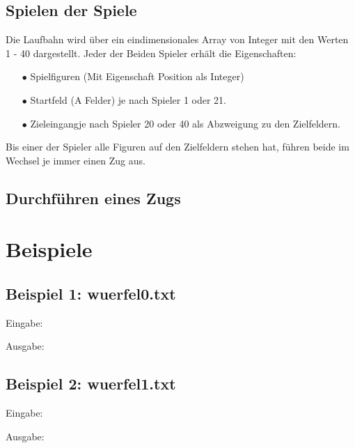 \documentclass[a4paper,11pt,ngerman]{scrartcl}
\begin{document}
\subsection{Spielen der \glqq Spiele\grqq}
Die Laufbahn wird über ein eindimensionales Array von Integer mit den Werten 1 - 40 dargestellt. Jeder der Beiden Spieler erhält die Eigenschaften:
\begin{enumerate}
	\item[$\bullet$] Spielfiguren (Mit Eigenschaft Position als Integer)
	\item[$\bullet$] Startfeld (\glqq A Felder\grqq) je nach Spieler 1 oder 21.
	\item[$\bullet$] \glqq Zieleingang\grqq \space je nach Spieler 20 oder 40 als Abzweigung zu den Zielfeldern.	
\end{enumerate} 
Bis einer der Spieler alle Figuren auf den Zielfeldern stehen hat, führen beide im Wechsel je immer einen Zug aus.
\subsection{Durchführen eines Zugs}


 

\section{Beispiele}
\subsection{Beispiel 1: wuerfel0.txt}
Eingabe:
\begin{tcolorbox}[center,width=12cm,title=Textfiles/wuerfel0.txt]
	\centering
	
\end{tcolorbox}
Ausgabe:
\centering
\begin{tcolorbox}[center,width=12cm,title=Textfiles/wuerfel0\_result.txt]
	
	
\end{tcolorbox}
\subsection{Beispiel 2: wuerfel1.txt}
Eingabe:
\begin{tcolorbox}[center,width=12cm,title=Textfiles/wuerfel1.txt]
	\centering
	
\end{tcolorbox}
Ausgabe:
\centering
\begin{tcolorbox}[center,width=12cm,title=Textfiles/wuerfel1\_result.txt]
	
	
\end{tcolorbox}
\end{document}
